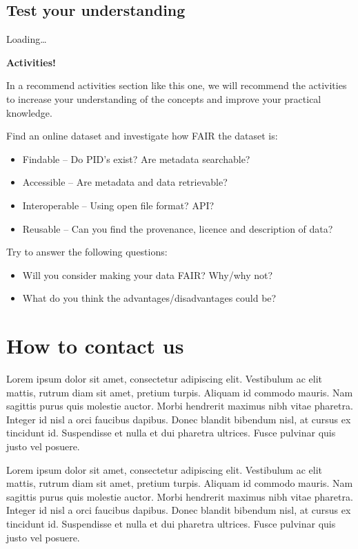 \documentclass[
]{book}
\providecommand{\tightlist}{%
  \setlength{\itemsep}{0pt}\setlength{\parskip}{0pt}}
\begin{document}
\hypertarget{test-your-understanding-1}{%
\section{Test your understanding}\label{test-your-understanding-1}}

Loading\ldots{}

\textbf{Activities!}

In a recommend activities section like this one, we will recommend the activities to increase your understanding of the concepts and improve your practical knowledge.

Find an online dataset and investigate how FAIR the dataset is:

\begin{itemize}
\tightlist
\item
  Findable -- Do PID's exist? Are metadata searchable?
\item
  Accessible -- Are metadata and data retrievable?
\item
  Interoperable -- Using open file format? API?
\item
  Reusable -- Can you find the provenance, licence and description of data?
\end{itemize}

Try to answer the following questions:

\begin{itemize}
\tightlist
\item
  Will you consider making your data FAIR? Why/why not?
\item
  What do you think the advantages/disadvantages could be?
\end{itemize}

\hypertarget{how-to-contact-us}{%
\chapter{How to contact us}\label{how-to-contact-us}}

Lorem ipsum dolor sit amet, consectetur adipiscing elit. Vestibulum ac elit mattis, rutrum diam sit amet, pretium turpis. Aliquam id commodo mauris. Nam sagittis purus quis molestie auctor. Morbi hendrerit maximus nibh vitae pharetra. Integer id nisl a orci faucibus dapibus. Donec blandit bibendum nisl, at cursus ex tincidunt id. Suspendisse et nulla et dui pharetra ultrices. Fusce pulvinar quis justo vel posuere.

Lorem ipsum dolor sit amet, consectetur adipiscing elit. Vestibulum ac elit mattis, rutrum diam sit amet, pretium turpis. Aliquam id commodo mauris. Nam sagittis purus quis molestie auctor. Morbi hendrerit maximus nibh vitae pharetra. Integer id nisl a orci faucibus dapibus. Donec blandit bibendum nisl, at cursus ex tincidunt id. Suspendisse et nulla et dui pharetra ultrices. Fusce pulvinar quis justo vel posuere.
\end{document}
